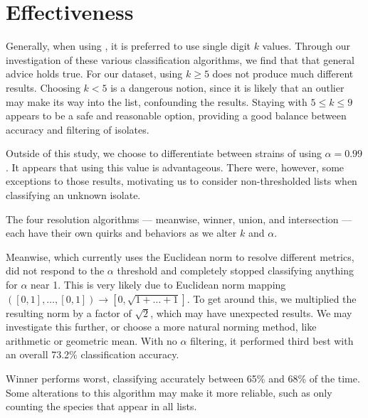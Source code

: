 \section{\krap{} Effectiveness}
Generally, when using \kNN{}, it is preferred to use single digit $k$ values. Through our investigation of these various \kNN{} classification algorithms, we find that that general advice holds true. For our dataset, using $k\geq5$ does not produce much different results. Choosing $k<5$ is a dangerous notion, since it is likely that an outlier may make its way into the \knnlong{} list, confounding the results. Staying with $5\leq k\leq9$ appears to be a safe and reasonable option, providing a good balance between accuracy and filtering of isolates.

Outside of this study, we choose to differentiate between strains of \ecoli{} using $\alpha=0.99$. It appears that using this value is advantageous. There were, however, some exceptions to those results, motivating us to consider non-thresholded \knnlong{} lists when classifying an unknown isolate.

The four resolution algorithms --- meanwise, winner, union, and intersection --- each have their own quirks and behaviors as we alter $k$ and $\alpha$. 

Meanwise, which currently uses the Euclidean norm to resolve different metrics, did not respond to the $\alpha$ threshold and completely stopped classifying anything for $\alpha$ near 1. This is very likely due to Euclidean norm mapping $([0,1],\dots,[0,1])\rightarrow [0,\sqrt{1+\dots+1}]$. To get around this, we multiplied the resulting norm by a factor of $\sqrt2$, which may have unexpected results. We may investigate this further, or choose a more natural norming method, like arithmetic or geometric mean. With no $\alpha$ filtering, it performed third best with an overall 73.2\% classification accuracy.

Winner performs worst, classifying accurately between 65\% and 68\% of the time. Some alterations to this algorithm may make it more reliable, such as only counting the species that appear in all lists.

